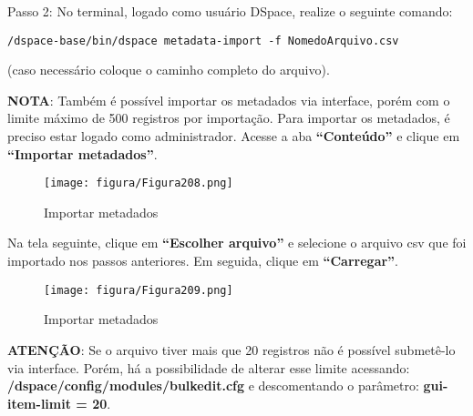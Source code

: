 \documentclass[12pt,hidelinks]{article}
\begin{document}
    Passo 2: No terminal, logado como usuário DSpace, realize o seguinte comando:
    
    \begin{verbatim}
/dspace-base/bin/dspace metadata-import -f NomedoArquivo.csv
        \end{verbatim}
    
  
    (caso necessário coloque o caminho completo do arquivo).
    
\newpage
    
    \textbf{NOTA}: Também é possível importar os metadados via interface, porém com o limite máximo de 500 registros por importação. Para importar os metadados, é preciso estar logado como administrador. Acesse a aba \textbf{“Conteúdo”} e clique em \textbf{“Importar metadados”}.
    
    \begin{figure}[!htp]
                \centering
                \texttt{[image: figura/Figura208.png]}
                \caption{Importar metadados}
            \label{Rotulo}
        \end{figure}
    
    Na tela seguinte, clique em \textbf{“Escolher arquivo”} e selecione o arquivo csv que foi importado nos passos anteriores. Em seguida, clique em \textbf{“Carregar”}.
    
    \begin{figure}[!htp]
                \centering
                \texttt{[image: figura/Figura209.png]}
                \caption{Importar metadados}
            \label{Rotulo}
        \end{figure}

    
    \textbf{ATENÇÃO}: Se o arquivo tiver mais que 20 registros não é possível submetê-lo via interface. Porém, há a possibilidade de alterar esse limite acessando: \textbf{/dspace/config/modules/bulkedit.cfg} e descomentando o parâmetro: \textbf{gui-item-limit = 20}.

\newpage
\end{document}
